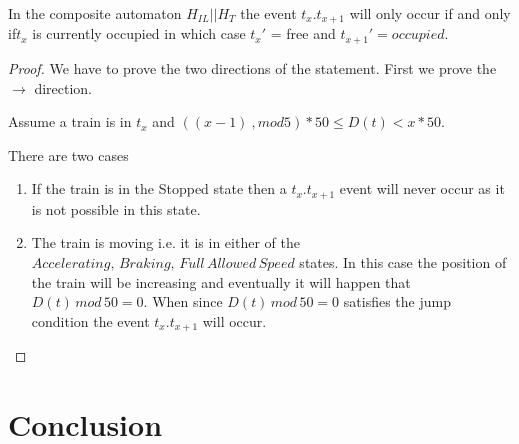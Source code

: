 \begin{mytheorem}

In the composite automaton $H_{IL}|| H_{T} $  the event $t_x.t_{x+1}$ will only occur if  and only if$t_x$ is currently occupied in which case $t_x'$ = free and $t_{x+1}' = occupied$.


\begin{proof}
We have to prove the two directions of the statement. First we prove the $\to$ direction.




Assume a train is in $t_x$ and $((x-1) \ ,mod 5) * 50 \leq D(t) < x *50$.

There are two cases
\begin{enumerate}
\item If the train is in the Stopped state then a $t_{x}.t_{x+1}$ event will never occur as it is not possible in this state.

\item The train is moving i.e. it is in either of the $Accelerating, \, Braking , \,  Full \, Allowed \, Speed$ states. In this case the position of the train will be increasing and eventually it will happen that $D(t) \,  mod \, 50 = 0$. When since $D(t) \, mod \, 50 = 0$  satisfies the jump condition the event
 $t_{x}.t_{x+ 1}$ will occur.  
 

\end{enumerate}
\end{proof}
\end{mytheorem}


\section{Conclusion}

